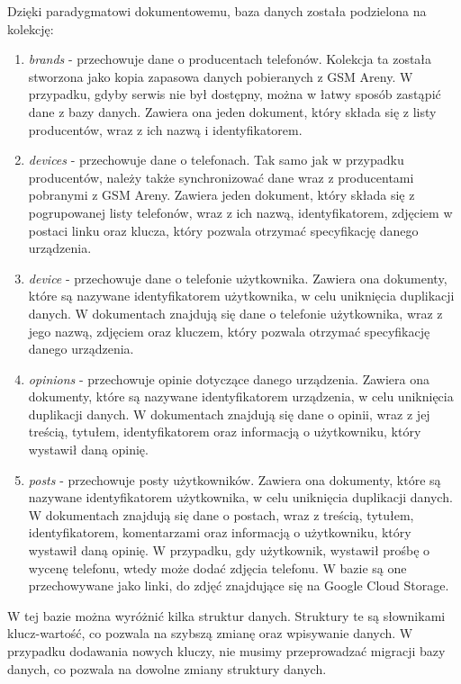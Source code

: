 Dzięki paradygmatowi dokumentowemu, baza danych została podzielona na kolekcję:
\begin{enumerate}
    \item \textit{brands} - przechowuje dane o producentach telefonów. Kolekcja ta została stworzona jako kopia zapasowa danych pobieranych z GSM Areny. W przypadku, gdyby serwis nie był dostępny, można w łatwy sposób zastąpić dane z bazy danych. Zawiera ona jeden dokument, który składa się z listy producentów, wraz z ich nazwą i identyfikatorem.
    \item \textit{devices} - przechowuje dane o telefonach. Tak samo jak w przypadku producentów, należy także synchronizować dane wraz z producentami pobranymi z GSM Areny. Zawiera jeden dokument, który składa się z pogrupowanej listy telefonów, wraz z ich nazwą, identyfikatorem, zdjęciem w postaci linku oraz klucza, który pozwala otrzymać specyfikację danego urządzenia.
    \item \textit{device} - przechowuje dane o telefonie użytkownika. Zawiera ona dokumenty, które są nazywane identyfikatorem użytkownika, w celu uniknięcia duplikacji danych. W dokumentach znajdują się dane o telefonie użytkownika, wraz z jego nazwą, zdjęciem oraz kluczem, który pozwala otrzymać specyfikację danego urządzenia.
    \item \textit{opinions} - przechowuje opinie dotyczące danego urządzenia. Zawiera ona dokumenty, które są nazywane identyfikatorem urządzenia, w celu uniknięcia duplikacji danych. W dokumentach znajdują się dane o opinii, wraz z jej treścią, tytułem, identyfikatorem oraz informacją o użytkowniku, który wystawił daną opinię.
    \item \textit{posts} - przechowuje posty użytkowników. Zawiera ona dokumenty, które są nazywane identyfikatorem użytkownika, w celu uniknięcia duplikacji danych. W dokumentach znajdują się dane o postach, wraz z treścią, tytułem, identyfikatorem, komentarzami oraz informacją o użytkowniku, który wystawił daną opinię. W przypadku, gdy użytkownik, wystawił prośbę o wycenę telefonu, wtedy może dodać zdjęcia telefonu. W bazie są one przechowywane jako linki, do zdjęć znajdujące się na Google Cloud Storage.
\end{enumerate}

W tej bazie można wyróżnić kilka struktur danych. Struktury te są słownikami klucz-wartość, co pozwala na szybszą zmianę oraz wpisywanie danych. W przypadku dodawania nowych kluczy, nie musimy przeprowadzać migracji bazy danych, co pozwala na dowolne zmiany struktury danych.

